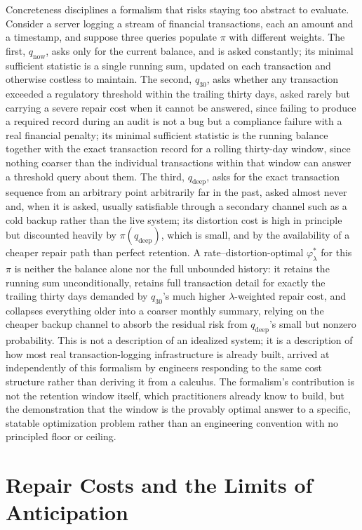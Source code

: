 \documentclass[11pt]{article}
\begin{document}
Concreteness disciplines a formalism that risks staying too abstract to evaluate. Consider a server logging a stream of financial transactions, each an amount and a timestamp, and suppose three queries populate $\pi$ with different weights. The first, $q_{\mathrm{now}}$, asks only for the current balance, and is asked constantly; its minimal sufficient statistic is a single running sum, updated on each transaction and otherwise costless to maintain. The second, $q_{30}$, asks whether any transaction exceeded a regulatory threshold within the trailing thirty days, asked rarely but carrying a severe repair cost when it cannot be answered, since failing to produce a required record during an audit is not a bug but a compliance failure with a real financial penalty; its minimal sufficient statistic is the running balance together with the exact transaction record for a rolling thirty-day window, since nothing coarser than the individual transactions within that window can answer a threshold query about them. The third, $q_{\mathrm{deep}}$, asks for the exact transaction sequence from an arbitrary point arbitrarily far in the past, asked almost never and, when it is asked, usually satisfiable through a secondary channel such as a cold backup rather than the live system; its distortion cost is high in principle but discounted heavily by $\pi(q_{\mathrm{deep}})$, which is small, and by the availability of a cheaper repair path than perfect retention. A rate--distortion-optimal $\varphi_\lambda^{*}$ for this $\pi$ is neither the balance alone nor the full unbounded history: it retains the running sum unconditionally, retains full transaction detail for exactly the trailing thirty days demanded by $q_{30}$'s much higher $\lambda$-weighted repair cost, and collapses everything older into a coarser monthly summary, relying on the cheaper backup channel to absorb the residual risk from $q_{\mathrm{deep}}$'s small but nonzero probability. This is not a description of an idealized system; it is a description of how most real transaction-logging infrastructure is already built, arrived at independently of this formalism by engineers responding to the same cost structure rather than deriving it from a calculus. The formalism's contribution is not the retention window itself, which practitioners already know to build, but the demonstration that the window is the provably optimal answer to a specific, statable optimization problem rather than an engineering convention with no principled floor or ceiling.

\section{Repair Costs and the Limits of Anticipation}
\end{document}
